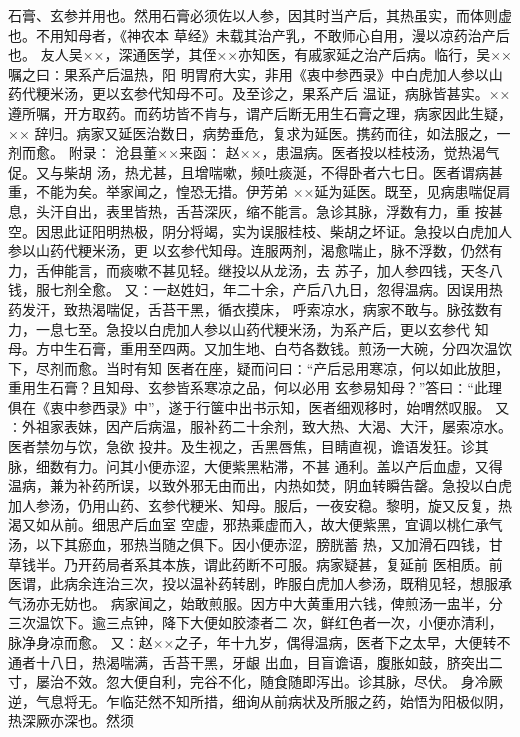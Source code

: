 \documentclass[a4paper,12pt,UTF8,twoside]{ctexbook}
\begin{document}
石膏、玄参并用也。然用石膏必须佐以人参，因其时当产后，其热虽实，而体则虚也。不用知母者，《神农本 
草经》未载其治产乳，不敢师心自用，漫以凉药治产后也。 
友人吴××，深通医学，其侄××亦知医，有戚家延之治产后病。临行，吴××嘱之曰∶果系产后温热，阳 
明胃府大实，非用《衷中参西录》中白虎加人参以山药代粳米汤，更以玄参代知母不可。及至诊之，果系产后 
温证，病脉皆甚实。××遵所嘱，开方取药。而药坊皆不肯与，谓产后断无用生石膏之理，病家因此生疑，×× 
辞归。病家又延医治数日，病势垂危，复求为延医。携药而往，如法服之，一剂而愈。 
附录∶ 
沧县董××来函∶ 
赵××，患温病。医者投以桂枝汤，觉热渴气促。又与柴胡 
汤，热尤甚，且增喘嗽，频吐痰涎，不得卧者六七日。医者谓病甚重，不能为矣。举家闻之，惶恐无措。伊芳弟 
××延为延医。既至，见病患喘促肩息，头汗自出，表里皆热，舌苔深灰，缩不能言。急诊其脉，浮数有力，重 
按甚空。因思此证阳明热极，阴分将竭，实为误服桂枝、柴胡之坏证。急投以白虎加人参以山药代粳米汤，更 
以玄参代知母。连服两剂，渴愈喘止，脉不浮数，仍然有力，舌伸能言，而痰嗽不甚见轻。继投以从龙汤，去 
苏子，加人参四钱，天冬八钱，服七剂全愈。 
又∶一赵姓妇，年二十余，产后八九日，忽得温病。因误用热药发汗，致热渴喘促，舌苔干黑，循衣摸床， 
呼索凉水，病家不敢与。脉弦数有力，一息七至。急投以白虎加人参以山药代粳米汤，为系产后，更以玄参代 
知母。方中生石膏，重用至四两。又加生地、白芍各数钱。煎汤一大碗，分四次温饮下，尽剂而愈。当时有知 
医者在座，疑而问曰∶“产后忌用寒凉，何以如此放胆，重用生石膏？且知母、玄参皆系寒凉之品，何以必用 
玄参易知母？”答曰∶“此理俱在《衷中参西录》中”，遂于行箧中出书示知，医者细观移时，始喟然叹服。 
又∶外祖家表妹，因产后病温，服补药二十余剂，致大热、大渴、大汗，屡索凉水。医者禁勿与饮，急欲 
投井。及生视之，舌黑唇焦，目睛直视，谵语发狂。诊其脉，细数有力。问其小便赤涩，大便紫黑粘滞，不甚 
通利。盖以产后血虚，又得温病，兼为补药所误，以致外邪无由而出，内热如焚，阴血转瞬告罄。急投以白虎 
加人参汤，仍用山药、玄参代粳米、知母。服后，一夜安稳。黎明，旋又反复，热渴又如从前。细思产后血室 
空虚，邪热乘虚而入，故大便紫黑，宜调以桃仁承气汤，以下其瘀血，邪热当随之俱下。因小便赤涩，膀胱蓄 
热，又加滑石四钱，甘草钱半。乃开药局者系其本族，谓此药断不可服。病家疑甚，复延前 
医相质。前医谓，此病余连治三次，投以温补药转剧，昨服白虎加人参汤，既稍见轻，想服承气汤亦无妨也。 
病家闻之，始敢煎服。因方中大黄重用六钱，俾煎汤一盅半，分三次温饮下。逾三点钟，降下大便如胶漆者二 
次，鲜红色者一次，小便亦清利，脉净身凉而愈。 
又∶赵××之子，年十九岁，偶得温病，医者下之太早，大便转不通者十八日，热渴喘满，舌苔干黑，牙龈 
出血，目盲谵语，腹胀如鼓，脐突出二寸，屡治不效。忽大便自利，完谷不化，随食随即泻出。诊其脉，尽伏。 
身冷厥逆，气息将无。乍临茫然不知所措，细询从前病状及所服之药，始悟为阳极似阴，热深厥亦深也。然须 
\end{document}
